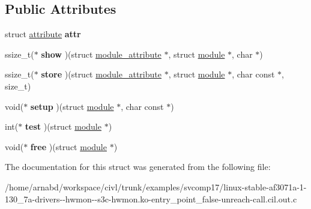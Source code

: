 \subsection*{Public Attributes}
\begin{DoxyCompactItemize}
\item 
\hypertarget{structmodule__attribute_aefff5d5c865c12ffc352eeb9350ebda5}{}struct \hyperlink{structattribute}{attribute} {\bfseries attr}\label{structmodule__attribute_aefff5d5c865c12ffc352eeb9350ebda5}

\item 
\hypertarget{structmodule__attribute_a1e59639ff6d0d342e6e2669b6c0226c0}{}ssize\+\_\+t($\ast$ {\bfseries show} )(struct \hyperlink{structmodule__attribute}{module\+\_\+attribute} $\ast$, struct \hyperlink{structmodule}{module} $\ast$, char $\ast$)\label{structmodule__attribute_a1e59639ff6d0d342e6e2669b6c0226c0}

\item 
\hypertarget{structmodule__attribute_a174eb246754b255b3c202a81e2416f89}{}ssize\+\_\+t($\ast$ {\bfseries store} )(struct \hyperlink{structmodule__attribute}{module\+\_\+attribute} $\ast$, struct \hyperlink{structmodule}{module} $\ast$, char const $\ast$, size\+\_\+t)\label{structmodule__attribute_a174eb246754b255b3c202a81e2416f89}

\item 
\hypertarget{structmodule__attribute_a69fccfeef31db407e37a52a9604cb5cd}{}void($\ast$ {\bfseries setup} )(struct \hyperlink{structmodule}{module} $\ast$, char const $\ast$)\label{structmodule__attribute_a69fccfeef31db407e37a52a9604cb5cd}

\item 
\hypertarget{structmodule__attribute_aed30adf91b4c32cd1c9ae7c5cdbc27c6}{}int($\ast$ {\bfseries test} )(struct \hyperlink{structmodule}{module} $\ast$)\label{structmodule__attribute_aed30adf91b4c32cd1c9ae7c5cdbc27c6}

\item 
\hypertarget{structmodule__attribute_af74ef80c128209a74c419dd5662557b3}{}void($\ast$ {\bfseries free} )(struct \hyperlink{structmodule}{module} $\ast$)\label{structmodule__attribute_af74ef80c128209a74c419dd5662557b3}

\end{DoxyCompactItemize}


The documentation for this struct was generated from the following file\+:\begin{DoxyCompactItemize}
\item 
/home/arnabd/workspace/civl/trunk/examples/svcomp17/linux-\/stable-\/af3071a-\/1-\/130\+\_\+7a-\/drivers-\/-\/hwmon-\/-\/s3c-\/hwmon.\+ko-\/entry\+\_\+point\+\_\+false-\/unreach-\/call.\+cil.\+out.\+c\end{DoxyCompactItemize}
